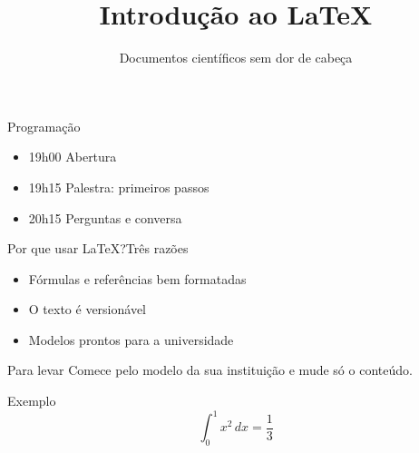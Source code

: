 \documentclass[aspectratio=169,10pt]{beamer}
\title[Introdução ao LaTeX]{Introdução ao LaTeX}
\subtitle{Documentos científicos sem dor de cabeça}
\begin{document}
\maketitle

\begin{frame}{Programação}
  \begin{itemize}
    \item 19h00 \textemdash{} Abertura
    \item 19h15 \textemdash{} Palestra: primeiros passos
    \item 20h15 \textemdash{} Perguntas e conversa
  \end{itemize}
\end{frame}

\begin{frame}{Por que usar LaTeX?}{Três razões}
  \begin{itemize}
    \item Fórmulas e referências bem formatadas
    \item O texto é versionável
    \item Modelos prontos para a universidade
  \end{itemize}
  \begin{block}{Para levar}
    Comece pelo modelo da sua instituição e mude só o conteúdo.
  \end{block}
\end{frame}

\begin{frame}{Exemplo}
  \[ \int_0^1 x^2\,dx = \frac{1}{3} \]
\end{frame}

\end{document}
